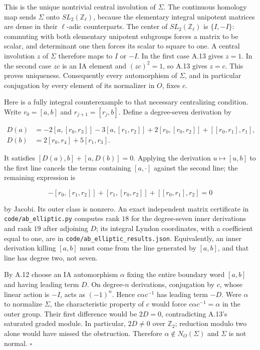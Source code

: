 \documentclass[10pt,a4paper]{article}
\begin{document}
This is the unique nontrivial central involution of \(\Sigma\). The continuous homology map sends \(\Sigma\) onto \(SL_2(\mathbb Z_\ell)\), because the elementary integral unipotent matrices are dense in their \(\ell\)-adic counterparts. The center of \(SL_2(\mathbb Z_\ell)\) is \(\{I,-I\}\): commuting with both elementary unipotent subgroups forces a matrix to be scalar, and determinant one then forces its scalar to square to one. A central involution \(z\) of \(\Sigma\) therefore maps to \(I\) or \(-I\). In the first case A.13 gives \(z=1\). In the second case \(zc\) is an IA element and \((zc)^2=1\), so A.13 gives \(z=c\). This proves uniqueness. Consequently every automorphism of \(\Sigma\), and in particular conjugation by every element of its normalizer in \(O\), fixes \(c\).

Here is a fully integral counterexample to that necessary centralizing condition. Write \(r_0=[a,b]\) and \(r_{j+1}=[r_j,b]\). Define a degree-seven derivation by

\[
\begin{aligned}
 D(a)&=-2[a,[r_0,r_3]]-3[a,[r_1,r_2]]
       +2[r_0,[r_0,r_2]]+[[r_0,r_1],r_1],\\
 D(b)&=2[r_0,r_4]+5[r_1,r_3].
\end{aligned}
\]

It satisfies \([D(a),b]+[a,D(b)]=0\). Applying the derivation \(u\mapsto[u,b]\) to the first line cancels the terms containing \([a,\cdot]\) against the second line; the remaining expression is

\[
 -[r_0,[r_1,r_2]]+[r_1,[r_0,r_2]]+[[r_0,r_1],r_2]=0
\]

by Jacobi. Its outer class is nonzero. An exact independent matrix certificate in \texttt{code/ab\_elliptic.py} computes rank \(18\) for the degree-seven inner derivations and rank \(19\) after adjoining \(D\); its integral Lyndon coordinates, with a coefficient equal to one, are in \texttt{code/ab\_elliptic\_results.json}. Equivalently, an inner derivation killing \([a,b]\) must come from the line generated by \([a,b]\), and that line has degree two, not seven.

By A.12 choose an IA automorphism \(\alpha\) fixing the entire boundary word \([a,b]\) and having leading term \(D\). On degree-\(n\) derivations, conjugation by \(c\), whose linear action is \(-I\), acts as \((-1)^n\). Hence \(c\alpha c^{-1}\) has leading term \(-D\). Were \(\alpha\) to normalize \(\Sigma\), the characteristic property of \(c\) would force \(c\alpha c^{-1}=\alpha\) in the outer group. Their first difference would be \(2D=0\), contradicting A.13's saturated graded module. In particular, \(2D\ne0\) over \(\mathbb Z_2\); reduction modulo two alone would have missed the obstruction. Therefore \(\alpha\notin N_O(\Sigma)\) and \(\Sigma\) is not normal. \(\square\)
\end{document}
